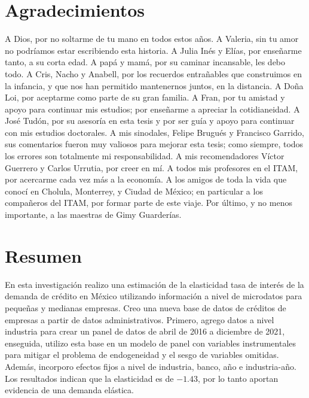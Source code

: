 \documentclass[11pt, oneside]{book}
\begin{document}

\section*{Agradecimientos}
\noindent A Dios, por no soltarme de tu mano en todos estos años. A Valeria, sin tu amor no podríamos estar escribiendo esta historia. A Julia Inés y Elías, por enseñarme tanto, a su corta edad. A papá y mamá, por su caminar incansable, les debo todo. A Cris, Nacho y Anabell, por los recuerdos entrañables que construimos en la infancia, y que nos han permitido mantenernos juntos, en la distancia. A Doña Loi, por aceptarme como parte de su gran familia.  A Fran, por tu amistad y apoyo para continuar mis estudios; por enseñarme a apreciar la cotidianeidad. A José Tudón, por su asesoría en esta tesis y por ser guía y apoyo para continuar con mis estudios doctorales. A mis sinodales, Felipe Brugués y Francisco Garrido, sus comentarios fueron muy valiosos para mejorar esta tesis; como siempre, todos los errores son totalmente mi responsabilidad. A mis recomendadores Víctor Guerrero y Carlos Urrutia, por creer en mí. A todos mis profesores en el ITAM, por acercarme cada vez más a la economía. A los amigos de toda la vida que conocí en Cholula, Monterrey, y Ciudad de México; en particular a los compañeros del ITAM, por formar parte de este viaje. Por último, y no menos importante, a las maestras de Gimy Guarderías.


\section*{Resumen}

\noindent En esta investigación realizo una estimación de la elasticidad tasa de interés de la demanda de crédito en México utilizando información a nivel de microdatos para pequeñas y medianas empresas. Creo una nueva base de datos de créditos de empresas a partir de datos administrativos. Primero, agrego datos a nivel industria para crear un panel de datos de abril de 2016 a diciembre de 2021, enseguida, utilizo esta base en un modelo de panel con variables instrumentales para mitigar el problema de endogeneidad y el sesgo de variables omitidas. Además, incorporo efectos fijos a nivel de industria, banco, año e industria-año. Los resultados indican que la elasticidad es de $-1.43$, por lo tanto aportan evidencia de una demanda elástica.
\end{document}

